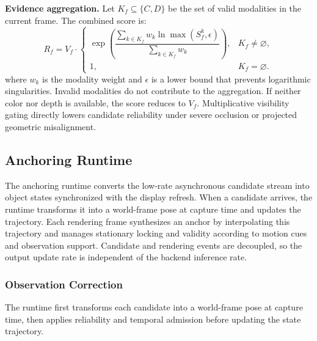 \documentclass[review]{vgtc}
\begin{document}
\textbf{Evidence aggregation.}
Let $K_f\subseteq\{C,D\}$ be the set of valid modalities in the current frame. The combined score is:
\begin{equation}
R_f = V_f \cdot
\begin{cases}
\exp\!\left(\dfrac{\sum_{k \in K_f} w_k \ln \max(S_f^{k}, \epsilon)}{\sum_{k \in K_f} w_k}\right), & K_f \neq \varnothing, \\[6pt]
1, & K_f = \varnothing.
\end{cases}
\label{eq:vcd}
\end{equation}
where $w_k$ is the modality weight and $\epsilon$ is a lower bound that prevents logarithmic singularities. Invalid modalities do not contribute to the aggregation. If neither color nor depth is available, the score reduces to $V_f$. Multiplicative visibility gating directly lowers candidate reliability under severe occlusion or projected geometric misalignment.

\subsection{Anchoring Runtime}\label{sec:anchoring}

The anchoring runtime converts the low-rate asynchronous candidate stream into object states synchronized with the display refresh. When a candidate arrives, the runtime transforms it into a world-frame pose at capture time and updates the trajectory. Each rendering frame synthesizes an anchor by interpolating this trajectory and manages stationary locking and validity according to motion cues and observation support. Candidate and rendering events are decoupled, so the output update rate is independent of the backend inference rate.

\subsubsection{Observation Correction}\label{sec:obs-update}

The runtime first transforms each candidate into a world-frame pose at capture time, then applies reliability and temporal admission before updating the state trajectory.
\end{document}
